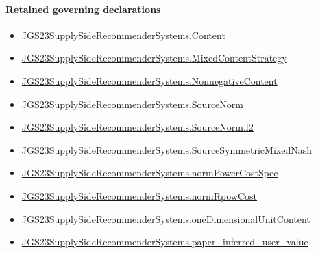 \documentclass[10pt]{article}
\begin{document}
\paragraph{Retained governing declarations}
\begin{itemize}\raggedright
\item \hyperlink{governing-declaration-367305fda50f0ada}{JGS23\allowbreak{}Supply\allowbreak{}Side\allowbreak{}Recommender\allowbreak{}Systems.\allowbreak{}Content}
\item \hyperlink{governing-declaration-2089965d06cf0282}{JGS23\allowbreak{}Supply\allowbreak{}Side\allowbreak{}Recommender\allowbreak{}Systems.\allowbreak{}Mixed\allowbreak{}Content\allowbreak{}Strategy}
\item \hyperlink{governing-declaration-d426babe40b9593c}{JGS23\allowbreak{}Supply\allowbreak{}Side\allowbreak{}Recommender\allowbreak{}Systems.\allowbreak{}Nonnegative\allowbreak{}Content}
\item \hyperlink{governing-declaration-6141339a5d3412d9}{JGS23\allowbreak{}Supply\allowbreak{}Side\allowbreak{}Recommender\allowbreak{}Systems.\allowbreak{}Source\allowbreak{}Norm}
\item \hyperlink{governing-declaration-9299663ffe3ecb38}{JGS23\allowbreak{}Supply\allowbreak{}Side\allowbreak{}Recommender\allowbreak{}Systems.\allowbreak{}Source\allowbreak{}Norm.\allowbreak{}l2}
\item \hyperlink{governing-declaration-8919e7334fa5ab60}{JGS23\allowbreak{}Supply\allowbreak{}Side\allowbreak{}Recommender\allowbreak{}Systems.\allowbreak{}Source\allowbreak{}Symmetric\allowbreak{}Mixed\allowbreak{}Nash}
\item \hyperlink{governing-declaration-6ba13dc1cae95e6e}{JGS23\allowbreak{}Supply\allowbreak{}Side\allowbreak{}Recommender\allowbreak{}Systems.\allowbreak{}norm\allowbreak{}Power\allowbreak{}Cost\allowbreak{}Spec}
\item \hyperlink{governing-declaration-54533813c77cea72}{JGS23\allowbreak{}Supply\allowbreak{}Side\allowbreak{}Recommender\allowbreak{}Systems.\allowbreak{}norm\allowbreak{}Rpow\allowbreak{}Cost}
\item \hyperlink{governing-declaration-dc75be9b72bb3fe0}{JGS23\allowbreak{}Supply\allowbreak{}Side\allowbreak{}Recommender\allowbreak{}Systems.\allowbreak{}one\allowbreak{}Dimensional\allowbreak{}Unit\allowbreak{}Content}
\item \hyperlink{governing-declaration-48347eafb3702717}{JGS23\allowbreak{}Supply\allowbreak{}Side\allowbreak{}Recommender\allowbreak{}Systems.\allowbreak{}paper\_\allowbreak{}inferred\_\allowbreak{}user\_\allowbreak{}value}

\end{itemize}
\end{document}
